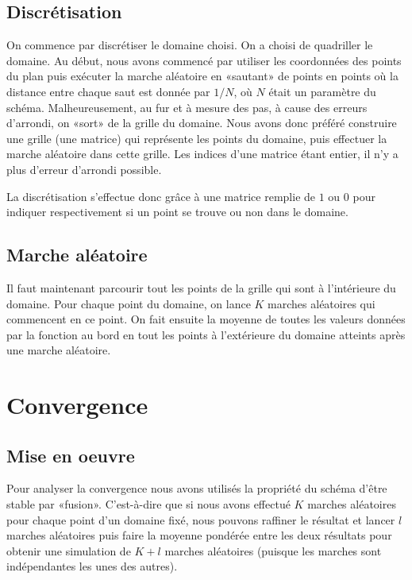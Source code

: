 \documentclass[12pt, a4paper]{article}
\begin{document}
\subsection{Discrétisation}
On commence par discrétiser le domaine choisi. On a choisi de quadriller le domaine.  Au début, nous
avons commencé par utiliser les coordonnées des points du plan puis exécuter la marche aléatoire en
«sautant» de points en points où la distance entre chaque saut est donnée par $1/N$, où $N$ était un
paramètre du schéma.  Malheureusement, au fur et à mesure des pas, à cause des erreurs d'arrondi, on
«sort» de la grille du domaine. Nous avons donc préféré construire une grille (une matrice) qui
représente les points du domaine, puis effectuer la marche aléatoire dans cette grille. Les indices
d'une matrice étant entier, il n'y a plus d'erreur d'arrondi possible.

La discrétisation s'effectue donc grâce à une matrice remplie de $1$ ou $0$ pour indiquer
respectivement si un point se trouve ou non dans le domaine.

\subsection{Marche aléatoire}

Il faut maintenant parcourir tout les points de la grille qui sont à l'intérieure du domaine.
Pour chaque point du domaine, on lance $K$  marches aléatoires qui commencent en ce point. On fait
ensuite la moyenne de toutes les valeurs données par la fonction au bord en tout les points à
l'extérieure du domaine atteints après une marche aléatoire.

\section{Convergence}

\subsection{Mise en oeuvre}
Pour analyser la convergence nous avons utilisés la propriété du schéma d'être stable par «fusion».
C'est-à-dire que si nous avons effectué $K$ marches aléatoires pour chaque point d'un domaine fixé,
nous pouvons raffiner le résultat et lancer $l$ marches aléatoires puis faire la moyenne pondérée entre
les deux résultats pour obtenir une simulation de $K+l$ marches aléatoires (puisque les marches sont
indépendantes les unes des autres).
\end{document}
